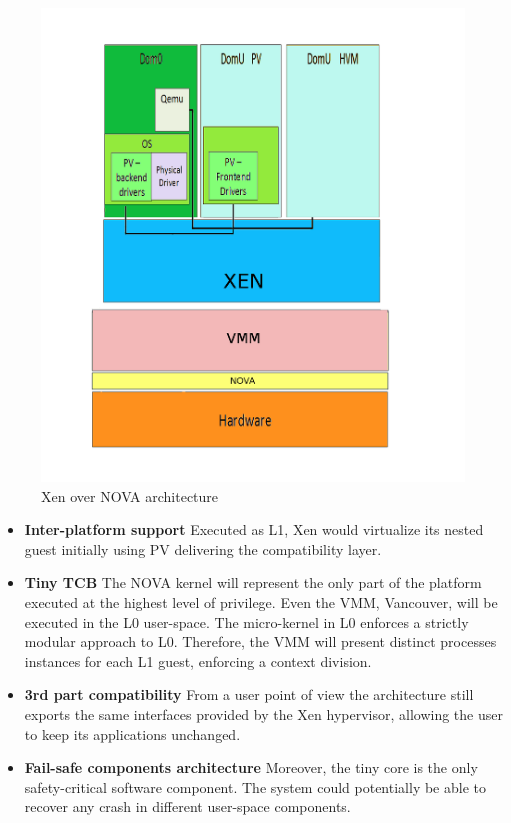 \documentclass{acm_proc_article-sp} %
\begin{document}
\begin{figure}
\caption{Xen over NOVA architecture}
\label{fig:io}
\begin{center}
\includegraphics[width=0.6\columnwidth]{article.png}
\end{center}
\end{figure}

\begin{itemize}[]
\item \textbf{Inter-platform support} Executed as L1, Xen would virtualize its nested guest initially using PV delivering the compatibility layer.
\item \textbf{Tiny TCB} The NOVA kernel will represent the only part of the platform executed at the highest level of privilege. Even the VMM, Vancouver, will be executed in the L0 user-space. The micro-kernel in L0 enforces a strictly modular approach to L0. Therefore, the VMM will present distinct processes instances for each L1 guest, enforcing a context division.
\item \textbf{3rd part compatibility} From a user point of view the architecture still exports the same interfaces provided by the Xen hypervisor, allowing the user to keep its applications unchanged.
\item \textbf{Fail-safe components architecture}  Moreover, the tiny core is the only safety-critical software component. The system could potentially be able to recover any crash in different user-space components.
\end{itemize}
\end{document}

